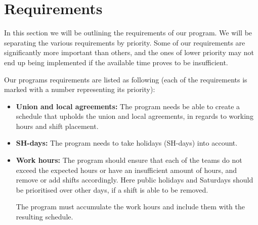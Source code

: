 \section{Requirements}
In this section we will be outlining the requirements of our program. We will be separating the various requirements by priority. Some of our requirements are significantly more important than others, and the ones of lower priority may not end up being implemented if the available time proves to be insufficient.

Our programs requirements are listed as following (each of the requirements is marked with a number representing its priority):
\begin{itemize}
    
    \item[] \textbf{Union and local agreements:} The program needs be able to create a schedule that upholds the union and local agreements, in regards to working hours and shift placement.
    
    \item[] \textbf{SH-days:} The program needs to take holidays (SH-days) into account.
    
    \item[] \textbf{Work hours:} The program should ensure that each of the teams do not exceed the expected hours or have an insufficient amount of hours, and remove or add shifts accordingly. Here public holidays and Saturdays should be prioritised over other days, if a shift is able to be removed.
    
    The program must accumulate the work hours and include them with the resulting schedule.
    
    
    

\end{itemize}
